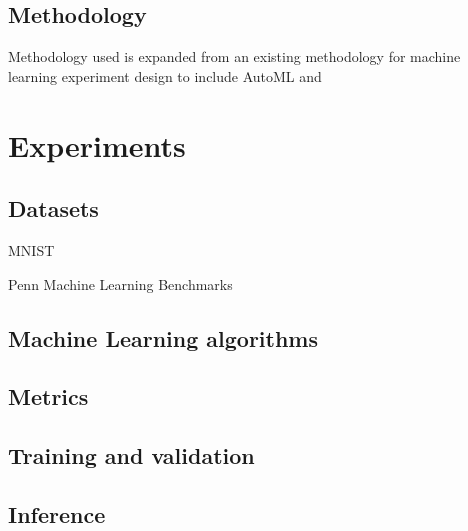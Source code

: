 \subsection{Methodology}

Methodology used is expanded from an existing methodology for machine learning experiment design \parencite{fernandez-lozanoMethodologyDesignExperiments2016} to include AutoML and

\section{Experiments}
\label{sec:experiments}
\subsection{Datasets}
MNIST \parencite{dengMNISTDatabaseHandwritten2012}

Penn Machine Learning Benchmarks \parencite{olsonPMLBLargeBenchmark2017}




\subsection{Machine Learning algorithms}
\subsection{Metrics}
\subsection{Training and validation}
\subsection{Inference}

